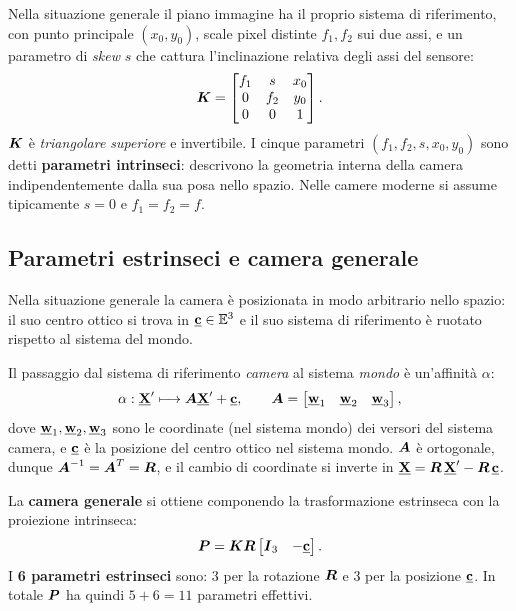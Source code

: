 Nella situazione generale il piano immagine ha il proprio sistema di
riferimento, con punto principale \((x_0, y_0)\), scale pixel distinte
\(f_1, f_2\) sui due assi, e un parametro di \emph{skew} \(s\) che
cattura l'inclinazione relativa degli assi del sensore:
\[
  \boldsymbol{K} =
  \begin{bmatrix}
    f_1 & s   & x_0 \\
    0   & f_2 & y_0 \\
    0   & 0   & 1
  \end{bmatrix}.
\]
\(\boldsymbol{K}\) è \emph{triangolare superiore} e invertibile.
I cinque parametri \((f_1, f_2, s, x_0, y_0)\) sono detti
\textbf{parametri intrinseci}: descrivono la geometria interna della
camera indipendentemente dalla sua posa nello spazio. Nelle camere
moderne si assume tipicamente \(s=0\) e \(f_1=f_2=f\).

\subsection{Parametri estrinseci e camera generale}
\label{sub:parametri_estrinseci}

Nella situazione generale la camera è posizionata in modo arbitrario
nello spazio: il suo centro ottico si trova in \(\underline{\mathbf{c}}\in\mathbb{E}^3\)
e il suo sistema di riferimento è ruotato rispetto al sistema del mondo.

Il passaggio dal sistema di riferimento \emph{camera} al sistema
\emph{mondo} è un'affinità \(\alpha\):
\[
  \alpha: \underline{\mathbf{X}}' \longmapsto \boldsymbol{A}\underline{\mathbf{X}}' + \underline{\mathbf{c}},
  \qquad
  \boldsymbol{A} =
  \begin{bmatrix}
    \underline{\mathbf{w}}_1 & \underline{\mathbf{w}}_2 & \underline{\mathbf{w}}_3
  \end{bmatrix},
\]
dove \(\underline{\mathbf{w}}_1,\underline{\mathbf{w}}_2,\underline{\mathbf{w}}_3\) sono le coordinate
(nel sistema mondo) dei versori del sistema camera, e
\(\underline{\mathbf{c}}\) è la posizione del centro ottico nel sistema mondo.
\(\boldsymbol{A}\) è ortogonale, dunque \(\boldsymbol{A}^{-1}=\boldsymbol{A}^T=\boldsymbol{R}\),
e il cambio di coordinate si inverte in
\(\underline{\mathbf{X}} = \boldsymbol{R}\,\underline{\mathbf{X}}' - \boldsymbol{R}\,\underline{\mathbf{c}}\).

La \textbf{camera generale} si ottiene componendo la trasformazione
estrinseca con la proiezione intrinseca:
\begin{equation}
  \boldsymbol{P} = \boldsymbol{K}\boldsymbol{R}
  \begin{bmatrix} \boldsymbol{I}_3 & -\underline{\mathbf{c}} \end{bmatrix}.
  \label{eq:P_canonica}
\end{equation}
I \textbf{6 parametri estrinseci} sono: 3 per la rotazione \(\boldsymbol{R}\)
e 3 per la posizione \(\underline{\mathbf{c}}\).
In totale \(\boldsymbol{P}\) ha quindi \(5+6=11\) parametri effettivi.

